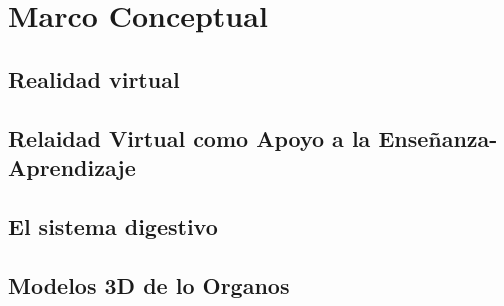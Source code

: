 \chapter{Marco Conceptual}

\section{Realidad virtual}

\section{Relaidad Virtual como Apoyo a la Enseñanza-Aprendizaje}%
\section{El sistema digestivo}
\section{Modelos 3D de lo Organos}%
